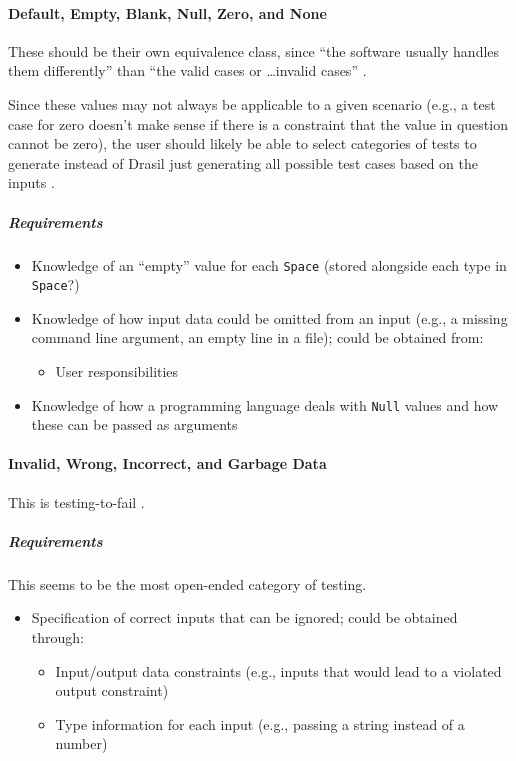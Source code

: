\paragraph{Default, Empty, Blank, Null, Zero, and None
      \cite[p.~77-78]{patton_software_2006}}

These should be their own equivalence class, since ``the software usually
handles them differently'' than ``the valid cases or \dots invalid cases''
\cite[p.~78]{patton_software_2006}.

Since these values may not always be applicable to a given scenario (e.g., a
test case for zero doesn't make sense if there is a constraint that the value
in question cannot be zero), the user should likely be able to select
categories of tests to generate instead of Drasil just generating all possible
test cases based on the inputs \cite{june_11_meeting}.

\subparagraph{Requirements}
\begin{itemize}
      \item Knowledge of an ``empty'' value for each \texttt{Space} (stored
            alongside each type in \texttt{Space}?)
      \item Knowledge of how input data could be omitted from an input
            (e.g., a missing command line argument, an empty line in a file);
            could be obtained from:
            \begin{itemize}
                  \item User responsibilities
            \end{itemize}
      \item Knowledge of how a programming language deals with \texttt{Null}
            values and how these can be passed as arguments
\end{itemize}

\paragraph{Invalid, Wrong, Incorrect, and Garbage Data
      \cite[p.~78-79]{patton_software_2006}}

This is testing-to-fail \cite[p.~77]{patton_software_2006}.

\subparagraph{Requirements}
This seems to be the most open-ended category of testing.
\begin{itemize}
      \item Specification of correct inputs that can be ignored;
            could be obtained through:
            \begin{itemize}
                  \item Input/output data constraints (e.g., inputs that would
                        lead to a violated output constraint)
                  \item Type information for each input (e.g., passing a string
                        instead of a number)
            \end{itemize}
\end{itemize}

